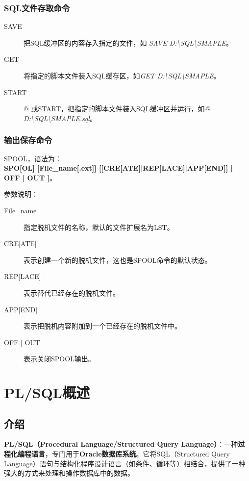 \documentclass[11pt, a4paper, oneside, UTF8]{ctexbook}
\let\kaishu\relax %
\begin{document}
\subsection{SQL文件存取命令}

\begin{description}
  \item[SAVE] 把SQL缓冲区的内容存入指定的文件，如 \textit{SAVE D:\textbackslash SQL\textbackslash SMAPLE}。
  \item[GET] 将指定的脚本文件装入SQL缓存区，如\textit{GET D:\textbackslash SQL\textbackslash SMAPLE}。
  \item[START] @ 或START，把指定的脚本文件装入SQL缓冲区并运行，如\textit{@ D:\textbackslash SQL\textbackslash SMAPLE.sql}。
\end{description}

\subsection{输出保存命令}
SPOOL，语法为：\\
{\bfseries\kaishu SPO[OL] [File\_name[.ext]] [[CRE[ATE]|REP[LACE]|APP[END]] | OFF | OUT ]}。

参数说明：
\begin{description}
  \item[File\_name] 指定脱机文件的名称，默认的文件扩展名为LST。
    \item[\textup{CRE[ATE]}] 表示创建一个新的脱机文件，这也是SPOOL命令的默认状态。
    \item[\textup{REP[LACE]}] 表示替代已经存在的脱机文件。
    \item[\textup{APP[END]}] 表示把脱机内容附加到一个已经存在的脱机文件中。
  \item[OFF | OUT] 表示关闭SPOOL输出。
\end{description}

\chapter{PL/SQL概述}
\section{介绍}
\textbf{PL/SQL（Procedural Language/Structured Query Language）}：一种\textbf{过程化编程语言}，专门用于\textbf{Oracle数据库系统}。它将SQL（Structured Query Language）语句与结构化程序设计语言（如条件、循环等）相结合，提供了一种强大的方式来处理和操作数据库中的数据。
\end{document}

